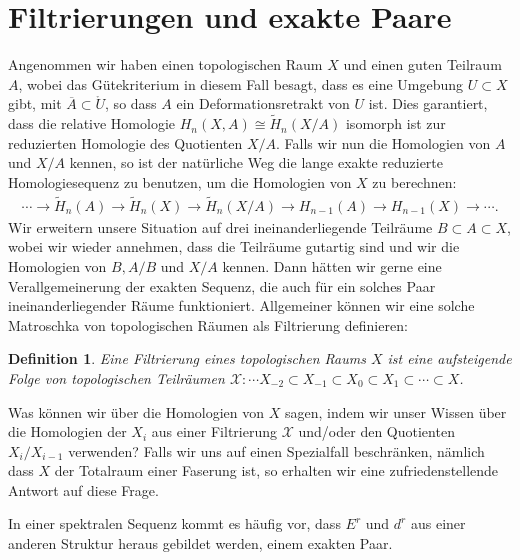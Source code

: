 \documentclass[12pt, hidelinks]{article}
\numberwithin{conj}{section}
\newtheorem{definition}[conj]{Definition}
\begin{document}
\section{Filtrierungen und exakte Paare}
Angenommen wir haben einen topologischen Raum $X$ und einen guten Teilraum $A$, wobei das Gütekriterium in diesem Fall besagt, dass es eine Umgebung $U \subset X$ gibt, mit $\overline{A} \subset \mathring{U}$, so dass $A$ ein Deformationsretrakt von $U$ ist. Dies garantiert, dass die relative Homologie $H_n(X,A) \cong \tilde{H}_n(X/A)$ isomorph ist zur reduzierten Homologie des Quotienten $X/A$. Falls wir nun die Homologien von $A$ und $X/A$ kennen, so ist der natürliche Weg die lange exakte reduzierte Homologiesequenz zu benutzen, um die Homologien von $X$ zu berechnen:
\begin{align}
    \cdots \to \tilde{H}_n(A) \to \tilde{H}_n(X) \to \tilde{H}_n(X/A) \to H_{n-1}(A) \to H_{n-1}(X) \to \cdots.
\end{align}
Wir erweitern unsere Situation auf drei ineinanderliegende Teilräume $B \subset A \subset X$, wobei wir wieder annehmen, dass die Teilräume gutartig sind und wir die Homologien von $B, A/B$ und $X/A$ kennen. Dann hätten wir gerne eine Verallgemeinerung der exakten Sequenz, die auch für ein solches Paar ineinanderliegender Räume funktioniert. Allgemeiner können wir eine solche Matroschka von topologischen Räumen als Filtrierung definieren:

\begin{definition}
    Eine Filtrierung eines topologischen Raums $X$ ist eine aufsteigende Folge von topologischen Teilräumen $\mathcal{X}: \cdots X_{-2} \subset X_{-1} \subset X_{0} \subset X_{1} \subset \cdots \subset X$.
\end{definition}

Was können wir über die Homologien von $X$ sagen, indem wir unser Wissen über die Homologien der $X_i$ aus einer Filtrierung $\mathcal{X}$ und/oder den Quotienten $X_i/X_{i-1}$ verwenden? Falls wir uns auf einen Spezialfall beschränken, nämlich dass $X$ der Totalraum einer Faserung ist, so erhalten wir eine zufriedenstellende Antwort auf diese Frage.

In einer spektralen Sequenz kommt es häufig vor, dass $E^r$ und $d^r$ aus einer anderen Struktur heraus gebildet werden, einem exakten Paar.
\end{document}
